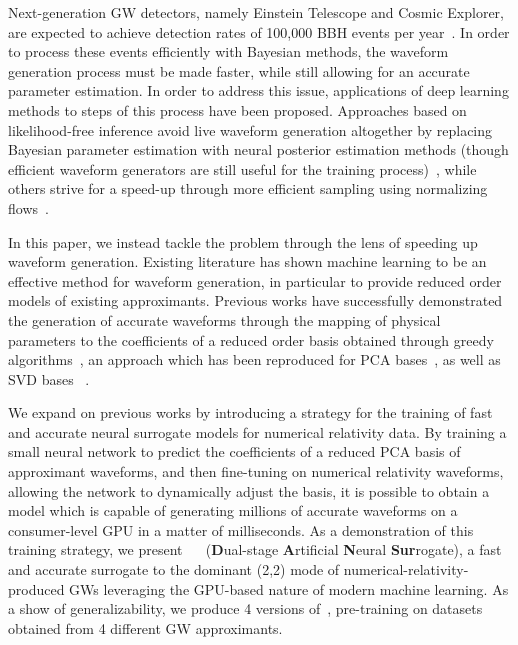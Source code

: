 \documentclass[%
 reprint,
superscriptaddress,
nofootinbib,
 amsmath,amssymb,
 aps,
prd,
floatfix,
]{revtex4-2}
\newcommand{\change}[1]{#1}
\begin{document}
Next-generation GW detectors, namely Einstein Telescope and Cosmic Explorer, are expected to achieve detection rates of 100,000 BBH events per year~\cite{ET_rates,CE_rates}. In order to process these events efficiently with Bayesian methods, the waveform generation process must be made faster, while still allowing for an accurate parameter estimation. In order to address this issue, applications of deep learning methods to steps of this process have been proposed. Approaches based on likelihood-free inference avoid live waveform generation altogether by replacing Bayesian parameter estimation with neural posterior estimation methods (though efficient waveform generators are still useful for the training process)~\cite{dingo_paper,PERCIVAL}, while others strive for a speed-up through more efficient sampling using normalizing flows~\cite{nessai,nessai_sw}. 

In this paper, we instead tackle the problem through the lens of speeding up waveform generation. Existing literature has shown machine learning to be an effective method for waveform generation, in particular to provide reduced order models of existing approximants. Previous works have successfully demonstrated the generation of accurate waveforms through the mapping of physical parameters to the coefficients of a reduced order basis obtained through greedy algorithms~\cite{ROMAN, ANN_Sur_FD, LucyThomasANN,Nousi_spiral}, an approach which has been reproduced for PCA bases~\cite{schmidt_ml_gw_bbh,grimbergen2024generatinghigherordermodes}, as well as SVD bases ~\cite{Luna2024,fontbute2024,SVD_meshfree}. 

We expand on previous works by introducing a strategy for the training of fast and accurate neural surrogate models for numerical relativity data. By training a small neural network to predict the coefficients of a reduced PCA basis of approximant waveforms, and then fine-tuning on numerical relativity waveforms, allowing the network to dynamically adjust the basis, it is possible to obtain a model which is capable of generating millions of accurate waveforms on a consumer-level GPU in a matter of milliseconds. As a demonstration of this training strategy, we present ~\dansur~ (\textbf{D}ual-stage \textbf{A}rtificial \textbf{N}eural \textbf{Sur}rogate), a fast and accurate surrogate to the dominant (2,2) mode of numerical-relativity-produced GWs leveraging the GPU-based nature of modern machine learning. \change{As a show of generalizability, we produce 4 versions of~\dansur, pre-training on datasets obtained from 4 different GW approximants.}
\end{document}
